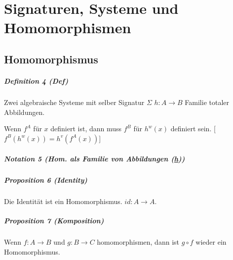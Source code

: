 




\pagestyle{scrheadings}

%

\setcounter{page}{1}
\tableofcontents 
\newpage


\setcounter{chapter}{0}
\setcounter{secnumdepth}{2}
\setcounter{page}{1} 



\chapter{Signaturen, Systeme und Homomorphismen}


\section{Homomorphismus}
\paragraph{Definition 4 (Def)}
Zwei algebraische Systeme mit selber Signatur $\Sigma$ $h: A \rightarrow B$ Familie totaler Abbildungen.

Wenn $f^A$ für $x$ definiert ist, dann muss $f^B$ für $h^w(x)$ definiert sein.
[$f^B(h^w(x)) = h^v(f^A(x))$]

\paragraph{Notation 5 (Hom. als Familie von Abbildungen (\underline{h}))}

\paragraph{Proposition 6 (Identity)}

Die Identität ist ein Homomorphismus. $id: A \rightarrow A$.

\paragraph{Proposition 7 (Komposition)}
Wenn $f: A \rightarrow B$ und $g: B \rightarrow C$ homomorphismen, dann ist $g \circ f$ wieder ein Homomorphismus.

